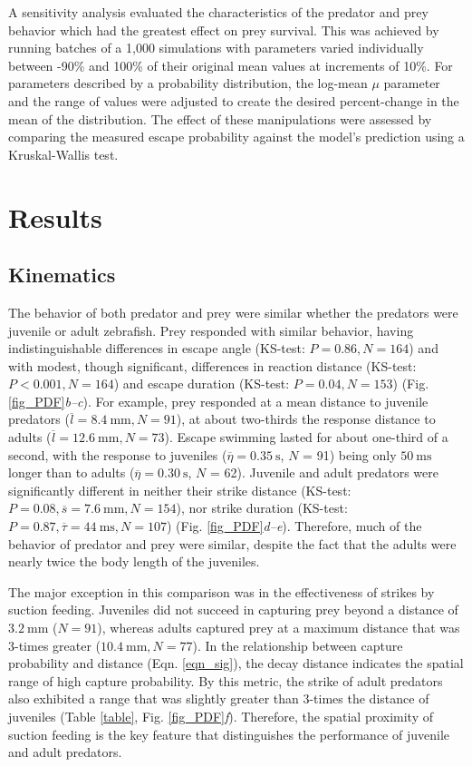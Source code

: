 \documentclass[]{rsos}%
\begin{document}
A sensitivity analysis evaluated the characteristics of the predator and prey behavior which had the greatest effect on prey survival. 
This was achieved by running batches of a 1,000 simulations with parameters varied individually between -90\% and 100\% of their original mean values at increments of 10\%.
For parameters described by a probability distribution, the log-mean $\mu$ parameter and the range of values were adjusted to create the desired percent-change in the mean of the distribution.
The effect of these manipulations were assessed by comparing the measured escape probability against the model's prediction using a Kruskal-Wallis test. 



\section{Results} %

\subsection{Kinematics} %
The behavior of both predator and prey were similar whether the predators were juvenile or adult zebrafish.
Prey responded with similar behavior, having indistinguishable differences in escape angle (KS-test: $P = 0.86, N = 164$) and with modest, though significant, differences in reaction distance (KS-test: $P < 0.001, N = 164$) and escape duration (KS-test: $P = 0.04, N = 153$) (Fig. \ref{fig_PDF}\textit{b--c}). 
For example, prey responded at a mean distance to juvenile predators ($\overline{l} = \SI{8.4}{\mm}, N = 91$), at about two-thirds the response distance to adults ($\overline{l} = \SI{12.6}{\mm}, N = 73$).
Escape swimming lasted for about one-third of a second, with the response to juveniles ($\overline{\eta} = \SI{0.35}{\s}$, $N$ = 91) being only  $\SI{50}{\ms}$ longer than to adults ($\overline{\eta} = \SI{0.30}{\s}$, $N$ = 62).
Juvenile and adult predators were significantly different in neither their strike distance (KS-test: $P = 0.08, \overline{s} = \SI{7.6}{\mm}, N = 154$), nor strike duration (KS-test: $P = 0.87, \overline{\tau} = \SI{44}{\ms}, N = 107$) (Fig. \ref{fig_PDF}\textit{d--e}).
Therefore, much of the behavior of predator and prey were similar, despite the fact that the adults were nearly twice the body length of the juveniles.

The major exception in this comparison was in the effectiveness of strikes by suction feeding.
Juveniles did not succeed in capturing prey beyond a distance of $\SI{3.2}{\mm}$ ($N = 91$), whereas adults captured prey at a maximum distance that was 3-times greater ($\SI{10.4}{\mm}, N = 77$).
In the relationship between capture probability and distance (Eqn. \ref{eqn_sig}), the decay distance indicates the spatial range of high capture probability. 
By this metric, the strike of adult predators also exhibited a range that was slightly greater than 3-times the distance of juveniles (Table \ref{table}, Fig. \ref{fig_PDF}\textit{f}).
Therefore, the spatial proximity of suction feeding is the key feature that distinguishes the performance of juvenile and adult predators.
\end{document}
